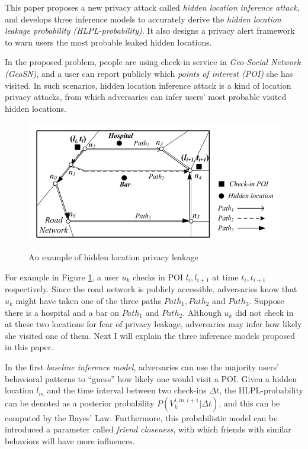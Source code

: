\documentclass[paper=a4, fontsize=18pt]{article} %
\numberwithin{equation}{section} %
\numberwithin{figure}{section} %
\numberwithin{table}{section} %
\begin{document}
This paper proposes a new privacy attack called \emph{hidden location inference attack}, and develops three inference models to accurately derive the \emph{hidden location leakage probability (HLPL-probability)}. It also designs a privacy alert framework to warn users the most probable leaked hidden locations.

In the proposed problem, people are using check-in service in \emph{Geo-Social Network (GeoSN)}, and a user can report publicly which \emph{points of interest (POI)} she has visited. In such scenarios, hidden location inference attack is a kind of location privacy attacks, from which adversaries can infer users' most probable visited hidden locations.

\begin{figure}[h]
  \centering
  \includegraphics[width=.6\linewidth]{7_25_checkin.png}\\
  \caption{An example of hidden location privacy leakage}\label{fig:checkin}
\end{figure}

For example in Figure \ref{fig:checkin}, a user $u_k$ checks in POI $l_i, l_{i+1}$ at time $t_i, t_{i+1}$ respectively. Since the road network is publicly accessible, adversaries know that $u_k$ might have taken one of the three paths $Path_1, Path_2$ and $Path_3$. Suppose there is a hospital and a bar on $Path_1$ and $Path_2$. Although $u_k$ did not check in at these two locations for fear of privacy leakage, adversaries may infer how likely she visited one of them. Next I will explain the three inference models proposed in this paper.

In the first \emph{baseline inference model}, adversaries can use the majority users' behavioral patterns to ``guess'' how likely one would visit a POI. Given a hidden location $l_m$ and the time interval between two check-ins $\Delta t$, the HLPL-probability can be denoted as a posterior probability $P(V_k^{i,m,i+1} | \Delta t)$, and this can be computed by the Bayes' Law. Furthermore, this probabilistic model can be introduced a parameter called \emph{friend closeness}, with which friends with similar behaviors will have more influences.
\end{document}
